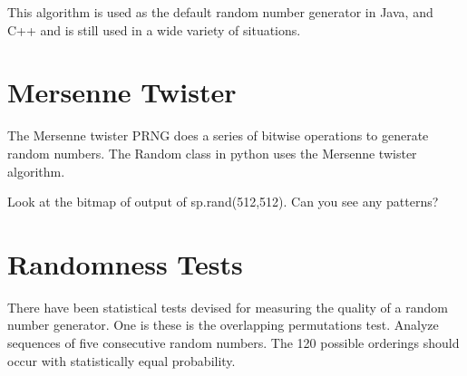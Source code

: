 This algorithm is used as the default random number generator in Java, and C++ and is still used in a wide variety of situations.

\section*{Mersenne Twister}

The Mersenne twister PRNG does a series of bitwise operations to generate random numbers.
The Random class in python uses the Mersenne twister algorithm. 

\begin{problem}
Look at the bitmap of output of sp.rand(512,512).
Can you see any patterns?
\end{problem}

\section*{Randomness Tests}

There have been statistical tests devised for measuring the quality of a random number generator. One is these is the overlapping permutations test. Analyze sequences of five consecutive random numbers. The 120 possible orderings should occur with statistically equal probability.

